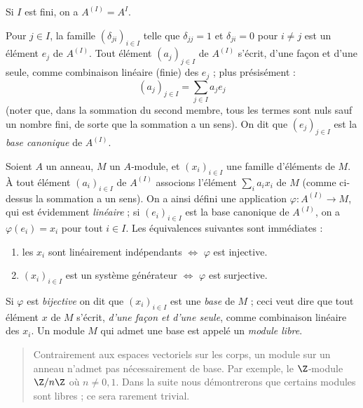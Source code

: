 \documentclass[11pt, %
  title in boldface,
  theorem in new line,
  theorem numbering = section,
  number theorems separately,
  simple name,
]{beaulivre}
\begin{document}
    Si \( I \) est fini, on a \( A^{(I)} = A^I \).

    Pour \( j \in I \), la famille \( (\delta_{ji})_{i \in I} \) telle que \( \delta_{jj} = 1 \) et \( \delta_{ji} = 0 \) pour \( i \neq j \) est un élément \( e_j \) de \( A^{(I)} \). Tout élément \( (a_j)_{j \in I} \) de \( A^{(I)} \) s'écrit, d'une façon et d'une seule, comme combinaison linéaire (finie) des \( e_j \) ; plus présisément :
    \begin{equation}
        (a_j)_{j \in I} = \sum_{j \in I} a_j e_j
    \end{equation}
    (noter que, dans la sommation du second membre, tous les termes sont nuls sauf un nombre fini, de sorte que la sommation a un sens). On dit que \( (e_j)_{j \in I} \) est la \emph{base canonique} de \( A^{(I)} \).

    Soient \( A \) un anneau, \( M \) un \( A \)‑module, et \( (x_i)_{i \in I} \) une famille d'éléments de \( M \). À tout élément \( (a_i)_{i \in I} \) de \( A^{(I)} \) associons l'élément \( \sum_i a_i x_i \) de \( M \) (comme ci-dessus la sommation a un sens). On a ainsi défini une application \( \varphi \colon A^{(I)} \to M \), qui est évidemment \emph{linéaire} ; si \( (e_i)_{i \in I} \) est la base canonique de \( A^{(I)} \), on a \( \varphi(e_i) = x_i \) pour tout \( i \in I \). Les équivalences suivantes sont immédiates :
    \begin{enumerate}
        \item les \( x_i \) sont linéairement indépendants \( \iff \) \( \varphi \) est injective.
        \item \( (x_i)_{i \in I} \) est un système générateur \( \iff \) \( \varphi \) est surjective.
    \end{enumerate}
    Si \( \varphi \) est \emph{bijective} on dit que \( (x_i)_{i \in I} \) est une \emph{base} de \( M \) ; ceci veut dire que tout élément \( x \) de \( M \) s'écrit, \emph{d'une façon et d'une seule}, comme combinaison linéaire des \( x_i \). Un module \( M \) qui admet une base est appelé un \emph{module libre}.

    \begin{quote}
        Contrairement aux espaces vectoriels sur les corps, un module sur un anneau n'admet pas nécessairement de base. Par exemple, le \( \Z \)‑module \( \Z/n\Z \) où \( n \neq 0,1 \). Dans la suite nous démontrerons que certains modules sont libres ; ce sera rarement trivial.
    \end{quote}
\end{document}
